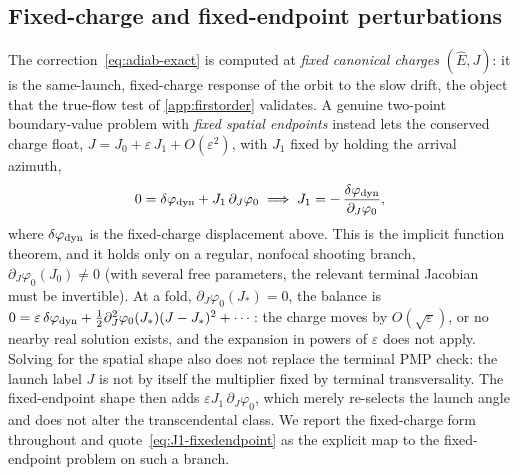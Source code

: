\documentclass[12pt]{iopart}
\theoremstyle{plain}
\theoremstyle{definition}
\theoremstyle{remark}
\newcommand{\Ehat}{\hat E}
\begin{document}
\subsection{Fixed-charge and fixed-endpoint perturbations}
The correction~\eqref{eq:adiab-exact}
is computed at \emph{fixed canonical charges} $(\Ehat,J)$: it is the same-launch,
fixed-charge response of the orbit to the slow drift, the object that the true-flow
test of \ref{app:firstorder} validates. A genuine two-point boundary-value
problem with \emph{fixed spatial endpoints} instead lets the conserved charge float,
$J=J_0+\varepsilon\,J_1+O(\varepsilon^2)$, with $J_1$ fixed by holding the arrival
azimuth,
\begin{equation}
    0=\delta\varphi_{\rm dyn}+J_1\,\partial_J\varphi_0
    \;\Longrightarrow\;
    J_1=-\,\frac{\delta\varphi_{\rm dyn}}{\partial_J\varphi_0},
    \label{eq:J1-fixedendpoint}
\end{equation}
where $\delta\varphi_{\rm dyn}$ is the fixed-charge displacement above. This is the
implicit function theorem, and it holds only on a regular, nonfocal shooting branch,
$\partial_J\varphi_0(J_0)\neq0$ (with several free parameters, the relevant terminal
Jacobian must be invertible). At a fold, $\partial_J\varphi_0(J_*)=0$, the balance is
$0=\varepsilon\,\delta\varphi_{\rm dyn}+\tfrac12\partial_J^2\varphi_0(J_*)(J-J_*)^2+\cdots$: the
charge moves by $O(\sqrt\varepsilon)$, or no nearby real solution exists, and the expansion
in powers of $\varepsilon$ does not apply. Solving for the spatial shape also does not
replace the terminal PMP check: the launch label $J$ is not by itself the multiplier fixed
by terminal transversality. The fixed-endpoint shape then adds $\varepsilon J_1\,\partial_J\varphi_0$, which merely
re-selects the launch angle and does not alter the transcendental class. We report
the fixed-charge form throughout and quote~\eqref{eq:J1-fixedendpoint} as the explicit
map to the fixed-endpoint problem on such a branch.
\end{document}
